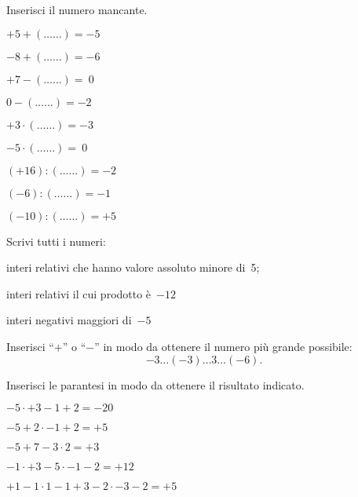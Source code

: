 \begin{esercizio}
Inserisci il numero mancante.
 \begin{multicols}{3}
 \begin{enumeratea}
 \item $+5 + (\ldots\ldots) = -5$
 \item $-8 + (\ldots\ldots) = -6$
 \item $+7 - (\ldots\ldots) =~0$
 \item $0 - (\ldots\ldots) = -2$
 \item $+3\cdot (\ldots\ldots) = -3$
 \item $-5\cdot (\ldots\ldots) =~0$
 \item $(+16): (\ldots\ldots) = -2$
 \item $(-6): (\ldots\ldots) = -1$
 \item $(-10): (\ldots\ldots) = +5$
 \end{enumeratea}
 \end{multicols}
\end{esercizio}

\begin{esercizio}
 Scrivi tutti i numeri:
 \begin{enumeratea}
 \item interi relativi che hanno valore assoluto minore di~5;
 \item interi relativi il cui prodotto è~$-12$
 \item interi negativi maggiori di~$-5$
 \end{enumeratea}
\end{esercizio}

\begin{esercizio}
Inserisci ``$+$'' o ``$-$'' in modo da ottenere il numero più grande possibile:
 \[-3\ldots(-3)\ldots3\ldots(-6).\]
\end{esercizio}

\begin{esercizio}
Inserisci le parantesi in modo da ottenere il risultato indicato.
 \begin{enumeratea}
 \item $-5 \cdot +3-1+2=-20$
 \item $-5+2\cdot-1+2=+5$
 \item $-5+7-3\cdot 2=+3$
 \item $-1\cdot +3-5\cdot -1-2=+12$
 \item $+1-1\cdot 1 -1+3-2\cdot -3-2=+5$
 \end{enumeratea}
\end{esercizio}

